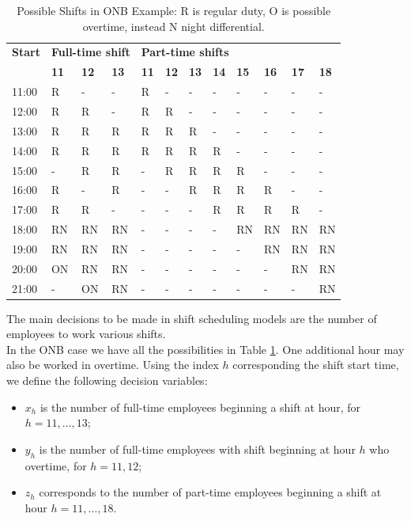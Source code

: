 \documentclass[a4paper,10 pt,titlepage,twoside]{book}
\theoremstyle{plain}
\theoremstyle{definition}
\theoremstyle{remark}
\begin{document}
\begin{table}[]\caption{\label{table:Shiftscheduling2}Possible Shifts in ONB Example: R is regular duty, O is possible overtime, instead N night differential.}
	\begin{center}
	\begin{tabular}{llllllllllll}
		\hline{\textbf{Start}} & \multicolumn{3}{l}{\textbf{Full-time shift}} & \multicolumn{8}{l}{\textbf{Part-time shifts}} \\ \cline{2-12} 
		& \textbf{11} & \textbf{12} & \textbf{13} & \textbf{11} & \textbf{12} & \textbf{13} & \textbf{14} & \textbf{15} & \textbf{16} & \textbf{17} & \textbf{18} \\ \hline
		11:00 & R & - & - & R & - & - & - & - & - & - & - \\
		12:00 & R & R & - & R & R & - & - & - & - & - & - \\
		13:00 & R & R & R & R & R & R & - & - & - & - & - \\
		14:00 & R & R & R & R & R & R & R & - & - & - & - \\
		15:00 & - & R & R & - & R & R & R & R & - & - & - \\
		16:00 & R & - & R & - & - & R & R & R & R & - & - \\
		17:00 & R & R & - & - & - & - & R & R & R & R & - \\
		18:00 & RN & RN & RN & - & - & - & - & RN & RN & RN & RN \\
		19:00 & RN & RN & RN & - & - & - & - & - & RN & RN & RN \\
		20:00 & ON & RN & RN & - & - & - & - & - & - & RN & RN \\
		21:00 & - & ON & RN & - & - & - & - & - & - & - & RN \\ \hline
	\end{tabular}
	\end{center}
\end{table}
The main decisions to be made in shift scheduling models are the number of employees to work various shifts. \\In the ONB case we have all the possibilities in Table \ref{table:Shiftscheduling2}. One additional hour may also be worked in overtime.
Using the index $h$ corresponding the shift start time, we define the following decision variables:
\begin{itemize}
	\item $x_{h}$ is the number of full-time employees beginning a shift at hour, for $h =11, \dots, 13$;
	\item $y_{h}$ is the number of full-time employees with shift beginning at hour $h$ who overtime, for $h=11, 12$;
	\item $z_{h}$ corresponds to the number of part-time employees beginning a shift at hour $h=11, \dots, 18$.
\end{itemize}
\end{document}
